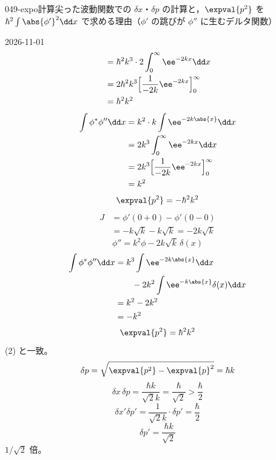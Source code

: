 \documentclass[uplatex,dvipdfmx,a4paper,11pt]{jsarticle}
\begin{document}
\begin{mondai}{049-expo}{計算}{尖った波動関数での $\delta x$・$\delta p$ の計算と，$\expval{p^{2}}$ を $\hbar^{2}\int\abs{\phi'}^{2}\dd x$ で求める理由（$\phi'$ の跳びが $\phi''$ に生むデルタ関数）}
\begin{kotaeutsushi}{2026-11-01}
\begin{align*}
&=\hbar^{2}k^{3}\cdot2\int_{0}^{\infty}\ee^{-2kx}\dd x\\
&=2\hbar^{2}k^{3}\Bigl[\frac{1}{-2k}\ee^{-2kx}\Bigr]_{0}^{\infty}\\
&=\hbar^{2}k^{2}
\end{align*}
\begin{align*}
\int\phi^{*}\phi''\dd x&=k^{2}\cdot k\int\ee^{-2k\abs{x}}\dd x\\
&=2k^{3}\int_{0}^{\infty}\ee^{-2kx}\dd x\\
&=2k^{3}\Bigl[\frac{1}{-2k}\ee^{-2kx}\Bigr]_{0}^{\infty}\\
&=k^{2}
\end{align*}
\[ \expval{p^{2}}=-\hbar^{2}k^{2} \]
\begin{align*}
J&=\phi'(0+0)-\phi'(0-0)\\
&=-k\sqrt{k}-k\sqrt{k}=-2k\sqrt{k}
\end{align*}
\[ \phi''=k^{2}\phi-2k\sqrt{k}\,\delta(x) \]
\begin{align*}
\int\phi^{*}\phi''\dd x&=k^{3}\int\ee^{-2k\abs{x}}\dd x\\
&\qquad-2k^{2}\int\ee^{-k\abs{x}}\delta(x)\dd x\\
&=k^{2}-2k^{2}\\
&=-k^{2}
\end{align*}
\[ \expval{p^{2}}=\hbar^{2}k^{2} \]
(2) と一致。
\[ \delta p=\sqrt{\expval{p^{2}}-\expval{p}^{2}}=\hbar k \]
\[ \delta x\,\delta p=\frac{\hbar k}{\sqrt{2}k}=\frac{\hbar}{\sqrt{2}}>\frac{\hbar}{2} \]
\[ \delta x'\delta p'=\frac{1}{\sqrt{2}k}\cdot\delta p'=\frac{\hbar}{2} \]
\[ \delta p'=\frac{\hbar k}{\sqrt{2}} \]
$1/\sqrt{2}$ 倍。
\end{kotaeutsushi}
\end{mondai}
\end{document}
